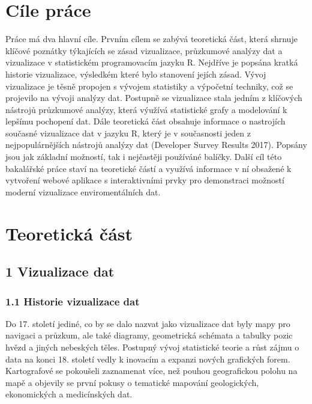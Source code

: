 \documentclass[12pt,]{article}
\begin{document}
\section{Cíle práce}\label{cile-prace}

\qquad Práce má dva hlavní cíle. Prvním cílem se zabývá teoretická část,
která shrnuje klíčové poznátky týkajících se zásad vizualizace,
průzkumové analýzy dat a vizualizace v statistickém programovacím jazyku
R. Nejdříve je popsána kratká historie vizualizace, výsledkém které bylo
stanovení jejích zásad. Vývoj vizualizace je těsně propojen s vývojem
statistiky a výpočetní techniky, což se projevilo na vývoji analýzy dat.
Postupně se vizualizace stala jedním z klíčových nástrojů průzkumové
analýzy, která výužívá statistické grafy a modelování k lepšímu
pochopení dat. Dále teoretická část obsahuje informace o nastrojích
současné vizualizace dat v jazyku R, který je v současnosti jeden z
nejpopulárnějších nástrojů analýzy dat (Developer Survey Results 2017).
Popsány jsou jak základní možností, tak i nejčastěji používáné balíčky.
Další cíl této bakalářské práce staví na teoretické částí a využívá
informace v ní obsažené k vytvoření webové aplikace s interaktivními
prvky pro demonstraci možností moderní vizualizace enviromentálních dat.

\newpage

\section*{Teoretická část}\label{teoreticka-cast}

\subsection{1 Vizualizace dat}\label{vizualizace-dat}

\subsubsection{1.1 Historie vizualizace
dat}\label{historie-vizualizace-dat}

\qquad Do 17. století jediné, co by se dalo nazvat jako vizualizace dat
byly mapy pro navigaci a průzkum, ale také diagramy, geometrická
schémata a tabulky pozic hvězd a jiných nebeských těles. Postupný vývoj
statistické teorie a růst zájmu o data na konci 18. století vedly k
inovacím a expanzi nových grafických forem. Kartografové se pokoušeli
zaznamenat více, než pouhou geografickou polohu na mapě a objevily se
první pokusy o tematické mapování geologických, ekonomických a
medicínských dat.
\end{document}
